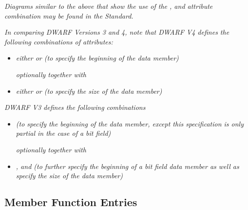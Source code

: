 \textit{Diagrams similar to the above that show the use of the
, 
 and 
 attribute
combination may be found in the 
 Standard.}

\textit{In comparing 
DWARF Versions 3 
and 
4, note that DWARF V4
defines the following combinations of attributes:}

\begin{itemize}
\item \textit{either  
or
(to specify the beginning of the data member)}

\textit{optionally together with}

\item  \textit{either  or 
 (to
specify the size of the data member)}

\end{itemize}

\textit{DWARF V3 defines the following combinations}

\begin{itemize}
\item \textit{ 
(to specify the beginning
of the data member, except this specification is only partial
in the case of a bit field) }

\textit{optionally together with}

\item \textit{, 
 and 
(to further specify the beginning of a bit field data member
as well as specify the size of the data member) }
\end{itemize}

\subsection{Member Function Entries}
\label{chap:memberfunctionentries}

